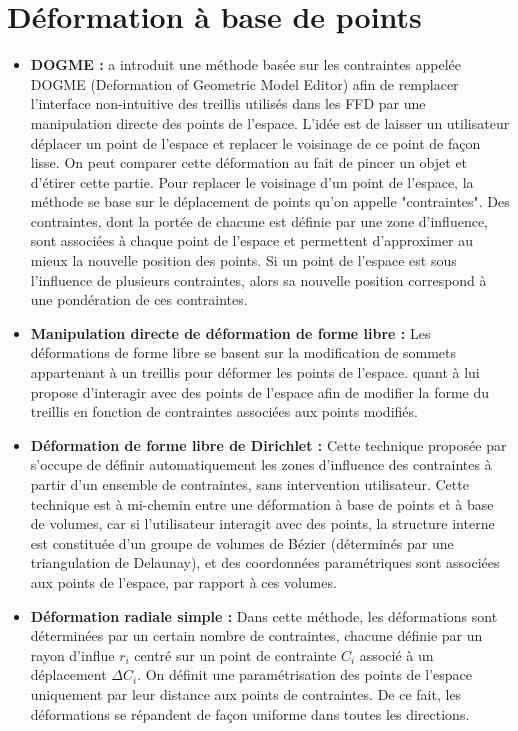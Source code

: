 \section{Déformation à base de points}
\begin{itemize}
\item{\textbf{DOGME :}} \cite{BB91} a introduit une méthode basée sur
  les contraintes appelée DOGME (Deformation of Geometric Model
  Editor) afin de remplacer l'interface non-intuitive des treillis
  utilisés dans les FFD par une manipulation directe des points de
  l'espace. L'idée est de laisser un utilisateur déplacer un point de
  l'espace et replacer le voisinage de ce point de façon lisse. On
  peut comparer cette déformation au fait de pincer un objet et
  d'étirer cette partie. Pour replacer le voisinage d'un point de
  l'espace, la méthode se base sur le déplacement de points qu'on
  appelle "contraintes". Des contraintes, dont la portée de chacune
  est définie par une zone d'influence, sont associées à chaque point
  de l'espace et permettent d'approximer au mieux la nouvelle position
  des points. Si un point de l'espace est sous l'influence de
  plusieurs contraintes, alors sa nouvelle position correspond à une
  pondération de ces contraintes.
\item{\textbf{Manipulation directe de déformation de forme libre :}}
  Les déformations de forme libre se basent sur la modification de
  sommets appartenant à un treillis pour déformer les points de
  l'espace. \cite{HHK92} quant à lui propose d'interagir avec des
  points de l'espace afin de modifier la forme du treillis en fonction
  de contraintes associées aux points modifiés.
\item{\textbf{Déformation de forme libre de Dirichlet :}} Cette
  technique proposée par \cite{MT97} s'occupe de définir
  automatiquement les zones d'influence des contraintes à partir d'un
  ensemble de contraintes, sans intervention utilisateur. Cette
  technique est à mi-chemin entre une déformation à base de points et
  à base de volumes, car si l'utilisateur interagit avec des points,
  la structure interne est constituée d'un groupe de volumes de Bézier
  (déterminés par une triangulation de Delaunay), et des coordonnées
  paramétriques sont associées aux points de l'espace, par rapport à
  ces volumes.
\item{\textbf{Déformation radiale simple :}} Dans cette méthode, les
  déformations sont déterminées par un certain nombre de contraintes,
  chacune définie par un rayon d'influe $r_i$ centré sur un point de
  contrainte $C_i$ associé à un déplacement $\Delta C_i$. On définit
  une paramétrisation des points de l'espace uniquement par leur
  distance aux points de contraintes. De ce fait, les déformations se
  répandent de façon uniforme dans toutes les directions.
\end{itemize}


